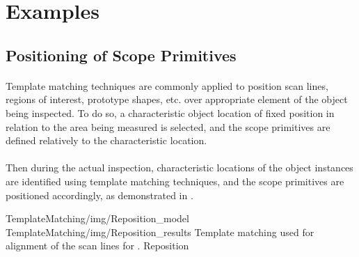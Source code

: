 \section{Examples}

\subsection{Positioning of Scope Primitives}

\paragraph*{}
Template matching techniques are commonly applied to position scan lines, regions of interest, prototype shapes, etc. over appropriate element of the object being inspected. To do so, a characteristic object location of fixed position in relation to the area being measured is selected, and the scope primitives are defined relatively to the characteristic location.

\paragraph*{}
Then during the actual inspection, characteristic locations of the object instances are identified using template matching techniques, and the scope primitives are positioned accordingly, as demonstrated in .

\twoFigures
{TemplateMatching/img/Reposition_model}
{TemplateMatching/img/Reposition_results}
{Template matching used for alignment of the scan lines for .}
{Reposition}
{\basicWidth}
